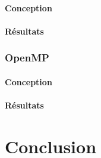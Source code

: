 \documentclass[12pt]{article}
\begin{document}
			\paragraph{Conception}
			\paragraph{Résultats}

		\subsubsection{OpenMP}
			\paragraph{Conception}
			\paragraph{Résultats}

\section{Conclusion}

\newpage


\end{document}
